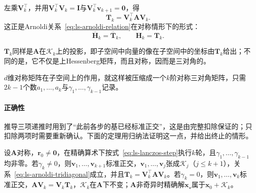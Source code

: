 左乘$\bm V_k^\top$，并用$\bm V_k^\top\bm V_k=\bm I$与$\bm V_k^\top\bm v_{k+1}=\bm 0$，得
\begin{equation}
 \bm T_k=\bm V_k^\top\bm A\bm V_k .
 \label{eq:ls-lanczos-projection}
\end{equation}
这正是Arnoldi关系~\eqref{eq:ls-arnoldi-relation}在对称情形下的形式：
\[
  \overline{\bm H}_k=\overline{\bm T}_k,\qquad \bm H_k=\bm T_k .
\]

$\bm T_k$同样是$\bm A$在$\mathcal K_k$上的投影，即子空间中向量的像在子空间中的坐标由$\bm T_k$给出；不同的是，它不仅是上Hessenberg矩阵，而且对称，因而是三对角的。

$d$维对称矩阵在子空间上的作用，就这样被压缩成一个$k$阶对称三对角矩阵，只需$2k-1$个数$a_1,\ldots,a_k$与$\gamma_1,\ldots,\gamma_{k-1}$记录。

\paragraph{正确性}
推导三项递推时用到了“此前各步的基已经标准正交”，这是由完整扣除保证的；只扣除两项时需要重新确认。下面的定理用归纳法证明这一点，并给出终止的情形。

\begin{theorem}[Lanczos关系]
\label{thm:ls-arnoldi-lanczos}
设$\bm A$对称，$\bm r_0\ne\bm 0$，在精确算术下按式~\eqref{eq:ls-lanczos-step}执行$k$轮，且$\gamma_1,\ldots,\gamma_{k-1}$均非零。若$\gamma_k\ne0$，则$\bm v_1,\ldots,\bm v_{k+1}$标准正交，$\bm v_1,\ldots,\bm v_j$张成$\mathcal K_j$（$j\le k+1$），关系~\eqref{eq:ls-arnoldi-tridiagonal}成立，并且$\bm T_k=\bm V_k^\top\bm A\bm V_k$。若$\gamma_k=0$，则$\bm v_1,\ldots,\bm v_k$标准正交，$\bm A\bm V_k=\bm V_k\bm T_k$，$\mathcal K_k$在$\bm A$下不变；$\bm A$非奇异时精确解$\bm x_\star$属于$\bm x_0+\mathcal K_k$。
\end{theorem}

